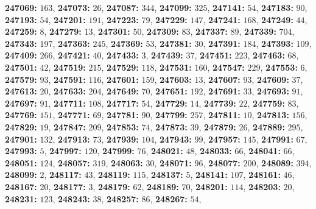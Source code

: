 \textsf{\bfseries 247069:} $163$, \textsf{\bfseries 247073:} $26$, \textsf{\bfseries 247087:} $344$, \textsf{\bfseries 247099:} $325$, \textsf{\bfseries 247141:} $54$, \textsf{\bfseries 247183:} $90$, \textsf{\bfseries 247193:} $54$, \textsf{\bfseries 247201:} $191$, \textsf{\bfseries 247223:} $79$, \textsf{\bfseries 247229:} $147$, \textsf{\bfseries 247241:} $168$, \textsf{\bfseries 247249:} $44$, \textsf{\bfseries 247259:} $8$, \textsf{\bfseries 247279:} $13$, \textsf{\bfseries 247301:} $50$, \textsf{\bfseries 247309:} $83$, \textsf{\bfseries 247337:} $89$, \textsf{\bfseries 247339:} $704$, \textsf{\bfseries 247343:} $197$, \textsf{\bfseries 247363:} $245$, \textsf{\bfseries 247369:} $53$, \textsf{\bfseries 247381:} $30$, \textsf{\bfseries 247391:} $184$, \textsf{\bfseries 247393:} $109$, \textsf{\bfseries 247409:} $266$, \textsf{\bfseries 247421:} $40$, \textsf{\bfseries 247433:} $3$, \textsf{\bfseries 247439:} $37$, \textsf{\bfseries 247451:} $223$, \textsf{\bfseries 247463:} $68$, \textsf{\bfseries 247501:} $42$, \textsf{\bfseries 247519:} $215$, \textsf{\bfseries 247529:} $118$, \textsf{\bfseries 247531:} $160$, \textsf{\bfseries 247547:} $229$, \textsf{\bfseries 247553:} $6$, \textsf{\bfseries 247579:} $93$, \textsf{\bfseries 247591:} $116$, \textsf{\bfseries 247601:} $159$, \textsf{\bfseries 247603:} $13$, \textsf{\bfseries 247607:} $93$, \textsf{\bfseries 247609:} $37$, \textsf{\bfseries 247613:} $20$, \textsf{\bfseries 247633:} $204$, \textsf{\bfseries 247649:} $70$, \textsf{\bfseries 247651:} $192$, \textsf{\bfseries 247691:} $33$, \textsf{\bfseries 247693:} $91$, \textsf{\bfseries 247697:} $91$, \textsf{\bfseries 247711:} $108$, \textsf{\bfseries 247717:} $54$, \textsf{\bfseries 247729:} $14$, \textsf{\bfseries 247739:} $22$, \textsf{\bfseries 247759:} $83$, \textsf{\bfseries 247769:} $151$, \textsf{\bfseries 247771:} $69$, \textsf{\bfseries 247781:} $90$, \textsf{\bfseries 247799:} $257$, \textsf{\bfseries 247811:} $10$, \textsf{\bfseries 247813:} $156$, \textsf{\bfseries 247829:} $19$, \textsf{\bfseries 247847:} $209$, \textsf{\bfseries 247853:} $74$, \textsf{\bfseries 247873:} $39$, \textsf{\bfseries 247879:} $26$, \textsf{\bfseries 247889:} $295$, \textsf{\bfseries 247901:} $132$, \textsf{\bfseries 247913:} $73$, \textsf{\bfseries 247939:} $104$, \textsf{\bfseries 247943:} $99$, \textsf{\bfseries 247957:} $145$, \textsf{\bfseries 247991:} $67$, \textsf{\bfseries 247993:} $5$, \textsf{\bfseries 247997:} $120$, \textsf{\bfseries 247999:} $76$, \textsf{\bfseries 248021:} $48$, \textsf{\bfseries 248033:} $66$, \textsf{\bfseries 248041:} $66$, \textsf{\bfseries 248051:} $124$, \textsf{\bfseries 248057:} $319$, \textsf{\bfseries 248063:} $30$, \textsf{\bfseries 248071:} $96$, \textsf{\bfseries 248077:} $200$, \textsf{\bfseries 248089:} $394$, \textsf{\bfseries 248099:} $2$, \textsf{\bfseries 248117:} $43$, \textsf{\bfseries 248119:} $115$, \textsf{\bfseries 248137:} $5$, \textsf{\bfseries 248141:} $107$, \textsf{\bfseries 248161:} $46$, \textsf{\bfseries 248167:} $20$, \textsf{\bfseries 248177:} $3$, \textsf{\bfseries 248179:} $62$, \textsf{\bfseries 248189:} $70$, \textsf{\bfseries 248201:} $114$, \textsf{\bfseries 248203:} $20$, \textsf{\bfseries 248231:} $123$, \textsf{\bfseries 248243:} $38$, \textsf{\bfseries 248257:} $86$, \textsf{\bfseries 248267:} $54$, 
